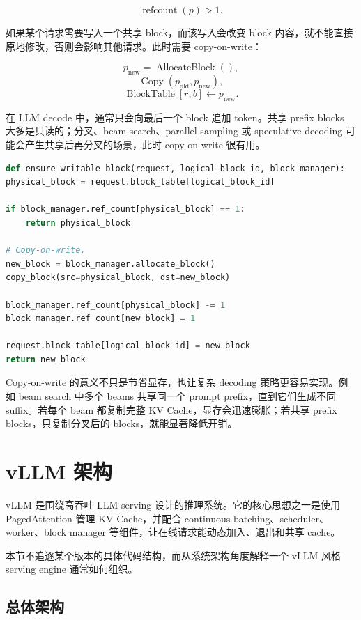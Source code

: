 \[
\operatorname{refcount}(p)>1.
\]

如果某个请求需要写入一个共享 block，而该写入会改变 block 内容，就不能直接原地修改，否则会影响其他请求。此时需要 copy-on-write：

\[
p_{\mathrm{new}}=\operatorname{AllocateBlock}(),
\]
\[
\operatorname{Copy}(p_{\mathrm{old}},p_{\mathrm{new}}),
\]
\[
\operatorname{BlockTable}[r,b]\leftarrow p_{\mathrm{new}}.
\]

在 LLM decode 中，通常只会向最后一个 block 追加 token。共享 prefix blocks 大多是只读的；分叉、beam search、parallel sampling 或 speculative decoding 可能会产生共享后再分叉的场景，此时 copy-on-write 很有用。

\begin{lstlisting}[language=Python,caption={Block 引用计数与 copy-on-write 的简化伪代码},label={lst:block-copy-on-write-pseudocode}]
def ensure_writable_block(request, logical_block_id, block_manager):
physical_block = request.block_table[logical_block_id]

if block_manager.ref_count[physical_block] == 1:
    return physical_block

# Copy-on-write.
new_block = block_manager.allocate_block()
copy_block(src=physical_block, dst=new_block)

block_manager.ref_count[physical_block] -= 1
block_manager.ref_count[new_block] = 1

request.block_table[logical_block_id] = new_block
return new_block

\end{lstlisting}

Copy-on-write 的意义不只是节省显存，也让复杂 decoding 策略更容易实现。例如 beam search 中多个 beams 共享同一个 prompt prefix，直到它们生成不同 suffix。若每个 beam 都复制完整 KV Cache，显存会迅速膨胀；若共享 prefix blocks，只复制分叉后的 blocks，就能显著降低开销。

\section{vLLM 架构}
\label{sec:vllm-architecture}

vLLM 是围绕高吞吐 LLM serving 设计的推理系统。它的核心思想之一是使用 PagedAttention 管理 KV Cache，并配合 continuous batching、scheduler、worker、block manager 等组件，让在线请求能动态加入、退出和共享 cache。

本节不追逐某个版本的具体代码结构，而从系统架构角度解释一个 vLLM 风格 serving engine 通常如何组织。

\subsection{总体架构}
\label{subsec:vllm-overall-architecture}

